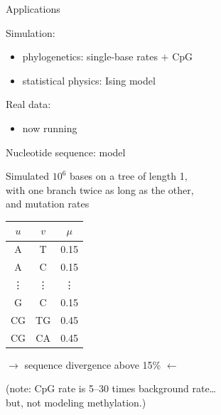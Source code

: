 \documentclass[smaller]{beamer}
\begin{document}
\begin{frame}{Applications}

  Simulation:
  \begin{itemize}
    \item phylogenetics: single-base rates $+$ CpG 
    \item statistical physics: Ising model
  \end{itemize}

  \vspace{3em}

  Real data:
  \begin{itemize}
    \item now running
  \end{itemize}

\end{frame}

\begin{frame}{Nucleotide sequence: model}

  Simulated $10^6$ bases on a tree of length 1, \\
  with one branch twice as long as the other,\\
  and mutation rates
  {\small
  \begin{center}
    \begin{tabular}{c@{\quad$\to$\quad}c@{\quad at rate\quad }c}
      $u$  &  $v$  &  $\mu$  \\
      \hline
       A & T   &  0.15  \\
       A & C   &  0.15  \\
       \vdots & \vdots & \vdots \\
       G & C &  0.15  \\
      CG   &  TG   &  0.45 \\
      CG   &  CA   &  0.45 
    \end{tabular}
  \end{center}
  }

  \vspace{2em}

  $\longrightarrow$ sequence divergence above 15\% $\longleftarrow$
  
  \vspace{2em}

  ({\struct note:} CpG rate is 5--30 times background rate\ldots\\
  \hspace{3em} but, not modeling methylation.)

\end{frame}
\end{document}

